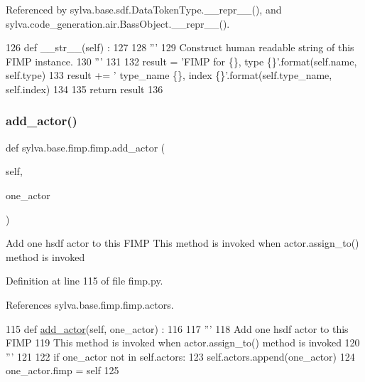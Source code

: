 Referenced by sylva.\+base.\+sdf.\+Data\+Token\+Type.\+\_\+\+\_\+repr\+\_\+\+\_\+(), and sylva.\+code\+\_\+generation.\+air.\+Bass\+Object.\+\_\+\+\_\+repr\+\_\+\+\_\+().


\begin{DoxyCode}
126     \textcolor{keyword}{def }\_\_str\_\_(self) :
127 
128       \textcolor{stringliteral}{'''}
129 \textcolor{stringliteral}{        Construct human readable string of this FIMP instance.}
130 \textcolor{stringliteral}{      '''}
131 
132       result = \textcolor{stringliteral}{'FIMP for \{\}, type \{\}'}.format(self.name, self.type)
133       result += \textcolor{stringliteral}{' type\_name \{\}, index \{\}'}.format(self.type\_name, self.index)
134 
135       \textcolor{keywordflow}{return} result
136 
\end{DoxyCode}
\mbox{\label{classsylva_1_1base_1_1fimp_1_1fimp_aae44656de7647ed6e62eaaec05022b42}} 
\subsubsection{\texorpdfstring{add\+\_\+actor()}{add\_actor()}}
{\footnotesize\ttfamily def sylva.\+base.\+fimp.\+fimp.\+add\+\_\+actor (\begin{DoxyParamCaption}\item[{}]{self,  }\item[{}]{one\+\_\+actor }\end{DoxyParamCaption})}

\begin{DoxyVerb}  Add one hsdf actor to this FIMP
  This method is invoked when actor.assign_to() method is invoked
\end{DoxyVerb}
 

Definition at line 115 of file fimp.\+py.



References sylva.\+base.\+fimp.\+fimp.\+actors.


\begin{DoxyCode}
115     \textcolor{keyword}{def }\hyperlink{namespacesylva_1_1base_1_1sdf_a2fc075a9dc81209dee7a5b97d99640e5}{add\_actor}(self, one\_actor) :
116 
117       \textcolor{stringliteral}{'''}
118 \textcolor{stringliteral}{        Add one hsdf actor to this FIMP}
119 \textcolor{stringliteral}{        This method is invoked when actor.assign\_to() method is invoked}
120 \textcolor{stringliteral}{      '''}
121 
122       \textcolor{keywordflow}{if} one\_actor \textcolor{keywordflow}{not} \textcolor{keywordflow}{in} self.actors:
123         self.actors.append(one\_actor)
124         one\_actor.fimp = self
125 
\end{DoxyCode}
\mbox{\label{classsylva_1_1base_1_1fimp_1_1fimp_a3a158e5ef136d9a8bf4a8d2e14f7b042}} 
